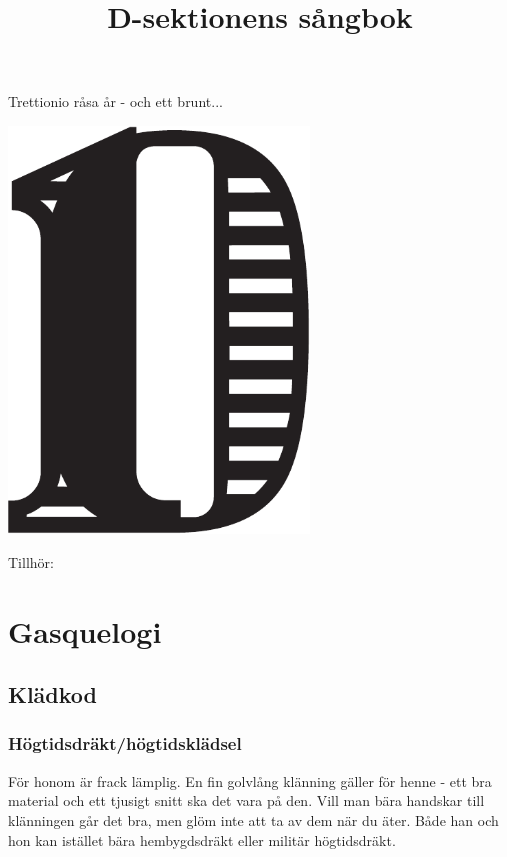 \documentclass{article}
\title{\fontsize{20}{20} \selectfont D-sektionens sångbok \vspace{-40pt}}
\author{}
\date{}
\begin{document}
\thispagestyle{empty}
\maketitle
\thispagestyle{empty} %

\begin{center}
Trettionio råsa år - och ett brunt...
\end{center}
\vspace{1mm} %

\begin{center}
   \includegraphics[width=0.6\textwidth]{res/D-symbol.pdf}
\end{center}

\newpage
Tillhör:
\newpage
\thispagestyle{plain}
\tableofcontents
\newpage
\thispagestyle{empty}
\section{Gasquelogi}
\subsection{Klädkod}
\subsubsection{Högtidsdräkt/högtidsklädsel}
För honom är frack lämplig. En fin golvlång klänning
gäller för henne - ett bra material och ett tjusigt snitt ska
det vara på den. Vill man bära handskar till klänningen
går det bra, men glöm inte att ta av dem när du äter.
Både han och hon kan istället bära hembygdsdräkt eller
militär högtidsdräkt.
\end{document}
